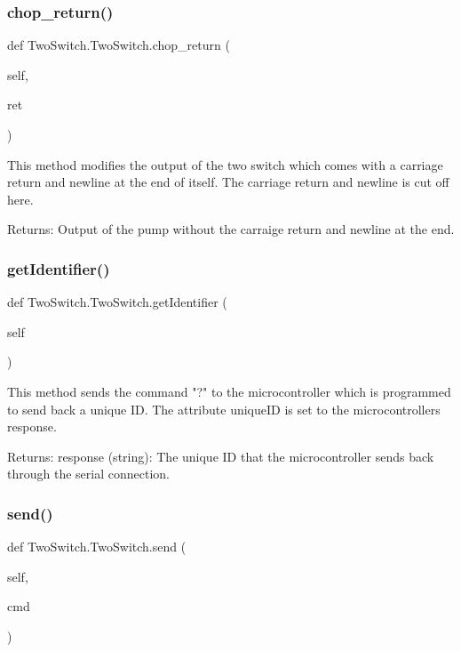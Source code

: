 \subsubsection{\texorpdfstring{chop\_return()}{chop\_return()}}
{\footnotesize\ttfamily def Two\+Switch.\+Two\+Switch.\+chop\+\_\+return (\begin{DoxyParamCaption}\item[{}]{self,  }\item[{}]{ret }\end{DoxyParamCaption})}

\begin{DoxyVerb}This method modifies the output of the two switch which comes with a carriage return and newline at the end of itself.
The carriage return and newline is cut off here.

Returns:
    Output of the pump without the carraige return and newline at the end.
\end{DoxyVerb}
 \mbox{\label{class_two_switch_1_1_two_switch_ac5eb2e77087de5dc473a0722b16863a5}} 
\subsubsection{\texorpdfstring{getIdentifier()}{getIdentifier()}}
{\footnotesize\ttfamily def Two\+Switch.\+Two\+Switch.\+get\+Identifier (\begin{DoxyParamCaption}\item[{}]{self }\end{DoxyParamCaption})}

\begin{DoxyVerb}This method sends the command "?" to the microcontroller which is programmed to send back a unique ID. The attribute uniqueID is set to the microcontrollers response.

Returns:
    response (string): The unique ID that the microcontroller sends back through the serial connection.
\end{DoxyVerb}
 \mbox{\label{class_two_switch_1_1_two_switch_a00b015b6f700f4d524056ff1c9de7c72}} 
\subsubsection{\texorpdfstring{send()}{send()}}
{\footnotesize\ttfamily def Two\+Switch.\+Two\+Switch.\+send (\begin{DoxyParamCaption}\item[{}]{self,  }\item[{}]{cmd }\end{DoxyParamCaption})}

